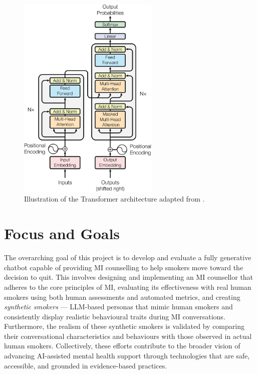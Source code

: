\begin{figure}[ht]
    \centering
    \includegraphics[width=0.6\textwidth]{fig/transformer_architecture.png}
    \caption{Illustration of the Transformer architecture adapted from \citet{vaswani2017attention}.}
    \label{fig:transformer}
\end{figure}


\section{Focus and Goals}
The overarching goal of this project is to develop and evaluate a fully generative chatbot capable of providing MI counselling to help smokers move toward the decision to quit. This involves designing and implementing an MI counsellor that adheres to the core principles of MI, evaluating its effectiveness with real human smokers using both human assessments and automated metrics, and creating \emph{synthetic smokers} --- LLM-based personas that mimic human smokers and consistently display realistic behavioural traits during MI conversations. Furthermore, the realism of these synthetic smokers is validated by comparing their conversational characteristics and behaviours with those observed in actual human smokers. Collectively, these efforts contribute to the broader vision of advancing AI-assisted mental health support through technologies that are safe, accessible, and grounded in evidence-based practices.

